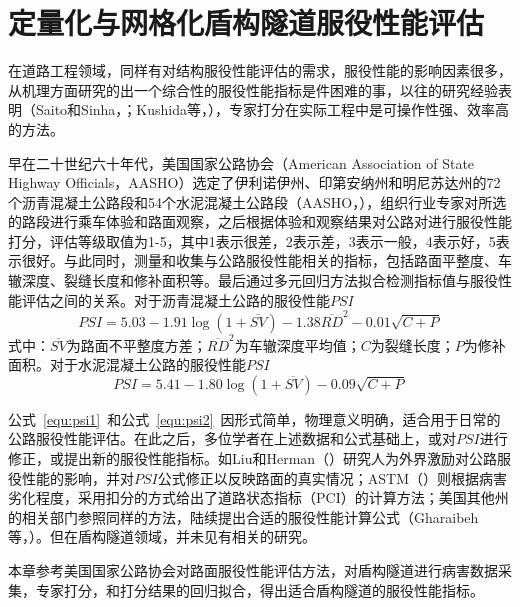 \chapter{定量化与网格化盾构隧道服役性能评估}
\label{chap:tsi}

在道路工程领域，同样有对结构服役性能评估的需求，服役性能的影响因素很多，从机理方面研究的出一个综合性的服役性能指标是件困难的事，以往的研究经验表明（Saito和Sinha，\citeyear{saito1991delphi}；Kushida等，\citeyear{kushida1997development}），专家打分在实际工程中是可操作性强、效率高的方法。

早在二十世纪六十年代，美国国家公路协会（American Association of State Highway Officials，AASHO）选定了伊利诺伊州、印第安纳州和明尼苏达州的72个沥青混凝土公路段和54个水泥混凝土公路段（AASHO，\citeyear{AASHO1962the}），组织行业专家对所选的路段进行乘车体验和路面观察，之后根据体验和观察结果对公路对进行服役性能打分，评估等级取值为1-5，其中1表示很差，2表示差，3表示一般，4表示好，5表示很好。与此同时，测量和收集与公路服役性能相关的指标，包括路面平整度、车辙深度、裂缝长度和修补面积等。最后通过多元回归方法拟合检测指标值与服役性能评估之间的关系。对于沥青混凝土公路的服役性能$PSI$
\begin{equation}
	\label{equ:psi1}
	PSI=5.03-1.91\log (1+\overline{SV})-1.38{{\overline{RD}}^{2}}-0.01\sqrt{C+P}
\end{equation}
式中：$\overline{SV}$为路面不平整度方差；${{\overline{RD}}^{2}}$为车辙深度平均值；$C$为裂缝长度；$P$为修补面积。对于水泥混凝土公路的服役性能$PSI$
\begin{equation}
	\label{equ:psi2}
	PSI=5.41-1.80\log (1+\overline{SV})-0.09\sqrt{C+P}
\end{equation}

公式~\ref{equ:psi1}~和公式~\ref{equ:psi2}~因形式简单，物理意义明确，适合用于日常的公路服役性能评估。在此之后，多位学者在上述数据和公式基础上，或对$PSI$进行修正，或提出新的服役性能指标。如Liu和Herman（\citeyear{liu1996new}）研究人为外界激励对公路服役性能的影响，并对$PSI$公式修正以反映路面的真实情况；ASTM（\citeyear{astm20096433}）则根据病害劣化程度，采用扣分的方式给出了道路状态指标（PCI）的计算方法；美国其他州的相关部门参照同样的方法，陆续提出合适的服役性能计算公式（Gharaibeh等，\citeyear{gharaibeh2009assessing}）。但在盾构隧道领域，并未见有相关的研究。

本章参考美国国家公路协会对路面服役性能评估方法，对盾构隧道进行病害数据采集，专家打分，和打分结果的回归拟合，得出适合盾构隧道的服役性能指标。

